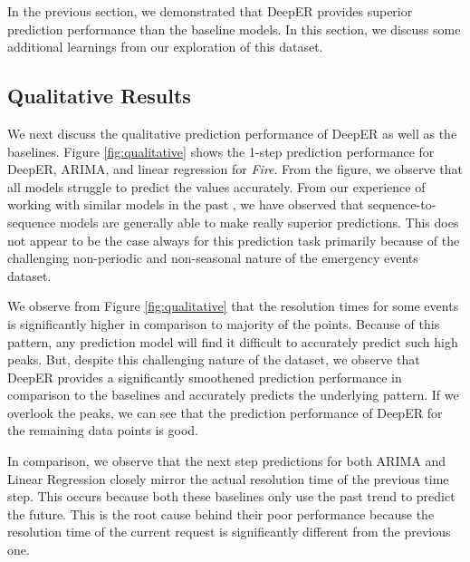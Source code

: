 


In the previous section, we demonstrated that DeepER provides superior prediction performance than the baseline models. In this section, we discuss some additional learnings from our exploration of this dataset.

\subsection{Qualitative Results}

 We next discuss the qualitative prediction performance of DeepER  as well as the baselines.  Figure \ref{fig:qualitative} shows  the 1-step prediction performance for DeepER, ARIMA, and linear regression for \textit{Fire}.  From the figure, we observe that all models  struggle to predict the values accurately.  From our experience of working with similar models in the past  \cite{SWaP, DeepFit, 8884240}, we have observed that sequence-to-sequence models are generally able to make really superior predictions. This does not appear to be the case always for this prediction task primarily because of the challenging non-periodic and non-seasonal nature  of the emergency events dataset. 
 
 We  observe from Figure \ref{fig:qualitative} that the resolution times for some events is significantly higher in comparison to majority of the points. Because of this pattern, any prediction model  will find it difficult to accurately predict such high peaks. But, despite this  challenging nature of the dataset,  we observe that DeepER   provides a significantly smoothened prediction performance in comparison to the baselines and accurately predicts the underlying pattern. If we overlook the peaks, we can see that  the prediction performance of DeepER for the remaining data points is good. 
 
 In comparison, we observe that the next step predictions for both ARIMA and Linear Regression closely mirror the  actual resolution time  of the previous time step. This occurs because both these baselines only use the past trend to predict the future. This is the root cause behind their poor performance because the  resolution time of the current request is significantly different from the previous one.
 

